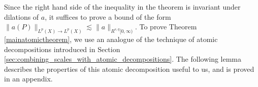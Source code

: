 %

%
%
%
%
%
%

Since the right hand side of the inequality in the theorem is invariant under dilations of $a$, it suffices to prove a bound of the form $\| a(P) \|_{L^p(X) \to L^p(X)} \lesssim \| a \|_{R^{s,q}[0,\infty)}$. To prove Theorem \ref{mainatomictheorem}, we use an analogue of the technique of atomic decompositions introduced in Section \ref{sec:combining_scales_with_atomic_decompositions}. The following lemma describes the properties of this atomic decomposition useful to us, and is proved in an appendix.

